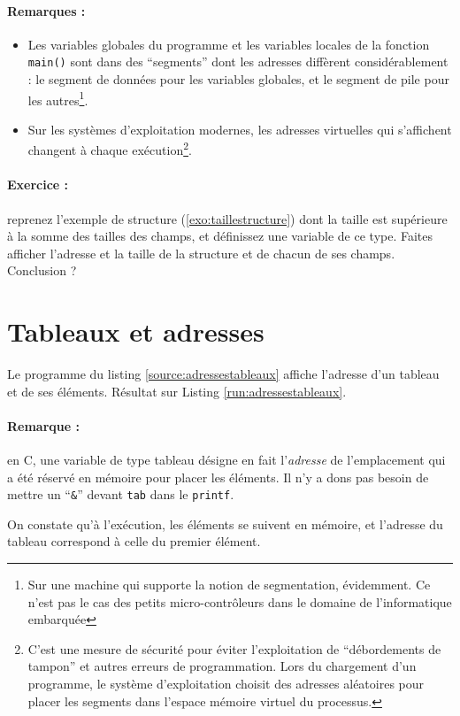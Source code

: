 \paragraph{Remarques :}
\begin{itemize}
  \item Les variables globales du programme et les variables locales
    de la fonction \texttt{main()} sont dans des ``segments'' dont les
    adresses diffèrent considérablement : le segment de données pour
    les variables globales, et le segment de pile pour les
    autres\footnote{Sur une machine qui supporte la notion de
      segmentation, évidemment. Ce n'est pas le cas des petits
      micro-contrôleurs dans le domaine de l'informatique embarquée}.
  \item Sur les systèmes d'exploitation modernes, les adresses
    virtuelles qui s'affichent changent à chaque
    exécution\footnote{C'est une mesure de sécurité pour éviter
      l'exploitation de ``débordements de tampon'' et autres erreurs
      de programmation. Lors du chargement d'un programme, le système d'exploitation choisit des adresses aléatoires pour placer les segments dans l'espace mémoire virtuel du processus.}.
\end{itemize}


\paragraph{Exercice :} reprenez l'exemple de structure (\ref{exo:taillestructure}) dont la taille est supérieure à la somme des tailles des champs, et définissez une variable de ce type. Faites afficher l'adresse et la taille de la structure et de chacun de ses champs. Conclusion ?


\section{Tableaux et adresses}

Le programme du listing \ref{source:adressestableaux} affiche
l'adresse d'un tableau et de ses éléments. Résultat sur Listing \ref{run:adressestableaux}.






\paragraph{Remarque :} en C, une variable de type tableau désigne en fait
l'\emph{adresse} de l'emplacement qui a été réservé en mémoire pour
placer les éléments. Il n'y a dons pas besoin de mettre un
``\texttt{\&}'' devant \texttt{tab} dans le \texttt{printf}.


On constate qu'à l'exécution, les
éléments se suivent en mémoire, et l'adresse du tableau
correspond à celle du premier élément.




